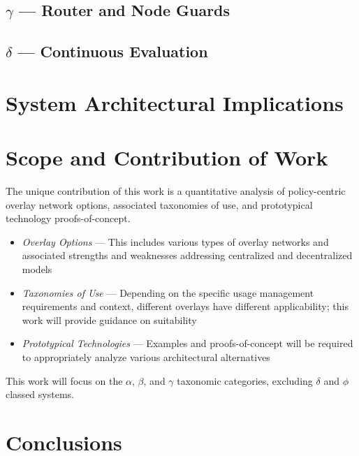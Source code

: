 \documentclass[12pt,letterpaper]{article}
\begin{document}
\subsection{$\gamma$ ---  Router and Node Guards}


\subsection{$\delta$ --- Continuous Evaluation}


\section{System Architectural Implications}


\section{Scope and Contribution of Work}
The unique contribution of this work is a quantitative analysis of policy-centric overlay network options, associated taxonomies of use, and prototypical technology proofs-of-concept.
\begin{itemize}
\item \textit{Overlay Options} --- This includes various types of overlay networks and associated strengths and weaknesses addressing centralized and decentralized models
\item \textit{Taxonomies of Use} --- Depending on the specific usage management requirements and context, different overlays have different applicability; this work will provide guidance on suitability
\item \textit{Prototypical Technologies} --- Examples and proofs-of-concept will be required to appropriately analyze various architectural alternatives
\end{itemize}
This work will focus on the $\alpha$, $\beta$, and $\gamma$ taxonomic categories, excluding $\delta$ and $\phi$ classed systems.

\section{Conclusions}



\end{document}

